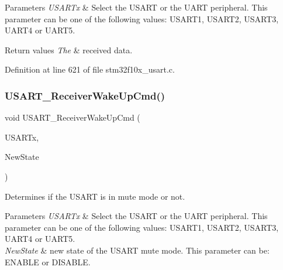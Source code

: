 \begin{DoxyParams}{Parameters}
{\em U\+S\+A\+R\+Tx} & Select the U\+S\+A\+RT or the U\+A\+RT peripheral. This parameter can be one of the following values\+: U\+S\+A\+R\+T1, U\+S\+A\+R\+T2, U\+S\+A\+R\+T3, U\+A\+R\+T4 or U\+A\+R\+T5. \\
\hline
\end{DoxyParams}

\begin{DoxyRetVals}{Return values}
{\em The} & received data. \\
\hline
\end{DoxyRetVals}


Definition at line 621 of file stm32f10x\+\_\+usart.\+c.

\mbox{\label{group___u_s_a_r_t___private___functions_gac27b78ce445a16fe33851d2f87781c02}} 
\subsubsection{\texorpdfstring{U\+S\+A\+R\+T\+\_\+\+Receiver\+Wake\+Up\+Cmd()}{USART\_ReceiverWakeUpCmd()}}
{\footnotesize\ttfamily void U\+S\+A\+R\+T\+\_\+\+Receiver\+Wake\+Up\+Cmd (\begin{DoxyParamCaption}\item[{\hyperlink{struct_u_s_a_r_t___type_def}{U\+S\+A\+R\+T\+\_\+\+Type\+Def} $\ast$}]{U\+S\+A\+R\+Tx,  }\item[{\hyperlink{group___exported__types_gac9a7e9a35d2513ec15c3b537aaa4fba1}{Functional\+State}}]{New\+State }\end{DoxyParamCaption})}



Determines if the U\+S\+A\+RT is in mute mode or not. 


\begin{DoxyParams}{Parameters}
{\em U\+S\+A\+R\+Tx} & Select the U\+S\+A\+RT or the U\+A\+RT peripheral. This parameter can be one of the following values\+: U\+S\+A\+R\+T1, U\+S\+A\+R\+T2, U\+S\+A\+R\+T3, U\+A\+R\+T4 or U\+A\+R\+T5. \\
\hline
{\em New\+State} & new state of the U\+S\+A\+RT mute mode. This parameter can be\+: E\+N\+A\+B\+LE or D\+I\+S\+A\+B\+LE. \\
\hline
\end{DoxyParams}

